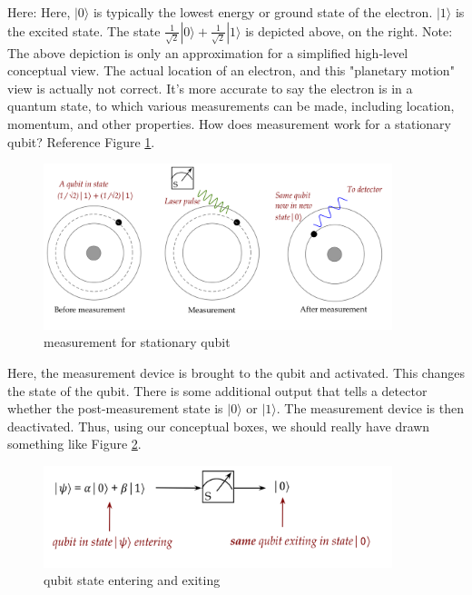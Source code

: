 \documentclass[main.tex]{subfiles}
\begin{document}
    Here: Here, $|0\rangle$ is typically the lowest energy or ground state of the electron. $|1\rangle$ is the excited state. The state $\frac{1}{\sqrt{2}}|0\rangle+\frac{1}{\sqrt{2}}|1\rangle$ is depicted above, on the right. Note: The above depiction is only an approximation for a simplified high-level conceptual view. The actual location of an electron, and this "planetary motion" view is actually not correct. It's more accurate to say the electron is in a quantum state, to which various measurements can be made, including location, momentum, and other properties. How does measurement work for a stationary qubit? Reference Figure \ref{fig:16qubit7}.
    
    \begin{figure}
        \centering
        \includegraphics[width=4in]{notes/figs/n05/16qubit7.png}
        \caption{measurement for stationary qubit}
        \label{fig:16qubit7}
    \end{figure}
    
    Here, the measurement device is brought to the qubit and activated. This changes the state of the qubit. There is some additional output that tells a detector whether the post-measurement state is $|0\rangle$ or $|1\rangle$. The measurement device is then deactivated. Thus, using our conceptual boxes, we should really have drawn something like Figure \ref{fig:17qubit8}.
    
    \begin{figure}
        \centering
        \includegraphics[width=4in]{notes/figs/n05/17qubit8.png}
        \caption{qubit state entering and exiting}
        \label{fig:17qubit8}
    \end{figure}
    
\end{document}
